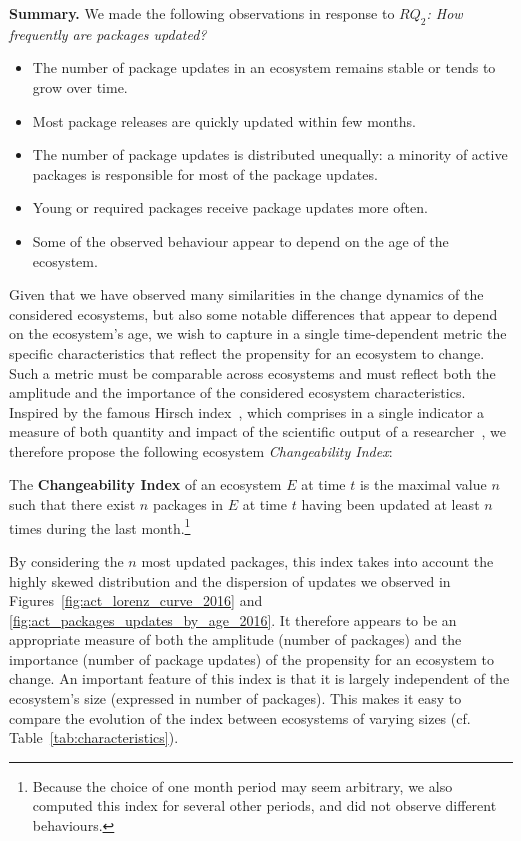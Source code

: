 \documentclass[smallextended]{svjour3}       %
\newcommand{\tab}[1]{Table~\ref{#1}}
\begin{document}
\begin{mdframed}
\textbf{Summary.} We made the following observations in response to \emph{$RQ_2$: How frequently are packages updated?}
\begin{itemize}
\item The number of package updates in an ecosystem remains stable or tends to grow over time.
\item Most package releases are quickly updated within few months.
\item The number of package updates is distributed unequally: a minority of active packages is responsible for most of the package updates.
\item Young or required packages receive package updates more often.
\item Some of the observed behaviour appear to depend on the age of the ecosystem.
\end{itemize}
\end{mdframed}

\bigskip

Given that we have observed many similarities in the change dynamics of the considered ecosystems, but also some notable differences that appear to depend on the ecosystem's age, we wish to capture in a single time-dependent metric the specific characteristics that reflect the propensity for an ecosystem to change.
Such a metric must be comparable across ecosystems and must reflect both the amplitude and the importance of the considered ecosystem characteristics. 
%
Inspired by the famous Hirsch index~\cite{Hirsch2005}, which comprises in a single indicator a measure of both quantity and impact of the scientific output of a researcher~\cite{Costas2007193}, we therefore propose 
the following ecosystem \textit{Changeability Index}:

\begin{definition}
  The \textbf{Changeability Index} of an ecosystem $E$ at time $t$ is the maximal value $n$ such that there exist $n$ packages in $E$ at time $t$ having been updated at least $n$ times during the last month.\footnote{Because the choice of one month period may seem arbitrary, we also computed this index for several other periods, and did not observe different behaviours.} 
\end{definition}

By considering the $n$ most updated packages, this index takes into account the highly skewed distribution and the dispersion of updates we observed in Figures~\ref{fig:act_lorenz_curve_2016} and \ref{fig:act_packages_updates_by_age_2016}. It therefore appears to be an appropriate measure of both the amplitude (number of packages) and the importance (number of package updates) of the propensity for an ecosystem to change.
An important feature of this index is that it is largely independent of the ecosystem's size (expressed in number of packages). This makes it easy to compare the evolution of the index between ecosystems of varying sizes (cf. \tab{tab:characteristics}).
\end{document}
